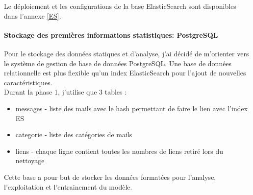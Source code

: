 \documentclass[a4paper,12pt]{article}
\begin{document}
				Le déploiement et les configurations de la base ElasticSearch sont disponibles dans l'annexe \ref{ES}.
				
				
			\paragraph{Stockage des premières informations statistiques: PostgreSQL} Pour le stockage des données statiques et d'analyse, j'ai décidé de m'orienter vers le système de gestion de base de données PostgreSQL. Une base de données relationnelle est plus flexible qu'un index ElasticSearch pour l'ajout de nouvelles caractéristiques. \\
			
				Durant la phase 1, j'utilise que 3 tables :
				\begin{itemize}
					\item messages - liste des mails avec le hash permettant de faire le lien avec l'index ES
					\item categorie - liste des catégories de mails
					\item liens - chaque ligne contient toutes les nombres de liens retiré lors du nettoyage
				\end{itemize}
				
				Cette base a pour but de stocker les données formatées pour l'analyse, l'exploitation et l'entrainement du modèle.
			
\end{document}
